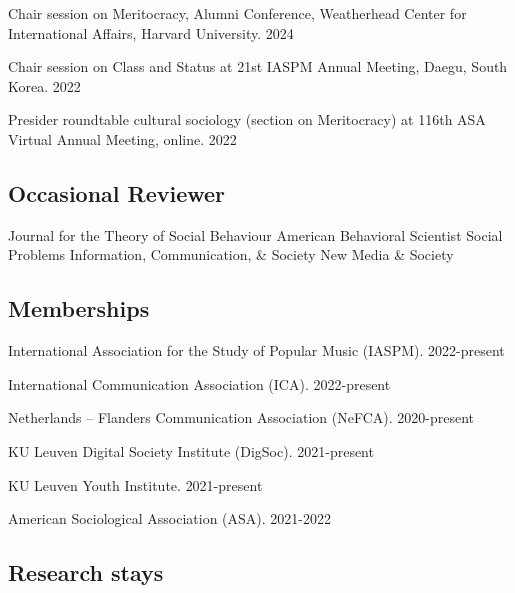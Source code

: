 \documentclass[12pt,]{article}
\begin{document}
Chair session on Meritocracy, Alumni Conference, Weatherhead Center for
International Affairs, Harvard University.
\hfill \begingroup\small 2024\endgroup

Chair session on Class and Status at 21st IASPM Annual Meeting, Daegu,
South Korea. \hfill \begingroup\small 2022\endgroup

Presider roundtable cultural sociology (section on Meritocracy) at 116th
ASA Virtual Annual Meeting, online.
\hfill \begingroup\small 2022\endgroup

\hypertarget{occasional-reviewer}{%
\subsection{Occasional Reviewer}\label{occasional-reviewer}}

Journal for the Theory of Social Behaviour \newline American Behavioral
Scientist \newline Social Problems \newline Information, Communication,
\& Society \newline New Media \& Society

\hypertarget{memberships}{%
\subsection{Memberships}\label{memberships}}

International Association for the Study of Popular Music (IASPM).
\hfill \begingroup\small 2022-present\endgroup

International Communication Association (ICA).
\hfill \begingroup\small 2022-present\endgroup

Netherlands -- Flanders Communication Association (NeFCA).
\hfill \begingroup\small 2020-present\endgroup

KU Leuven Digital Society Institute (DigSoc).
\hfill \begingroup\small 2021-present\endgroup

KU Leuven Youth Institute.
\hfill \begingroup\small 2021-present\endgroup

American Sociological Association (ASA).
\hfill \begingroup\small 2021-2022\endgroup

\hypertarget{research-stays}{%
\subsection{Research stays}\label{research-stays}}
\end{document}
